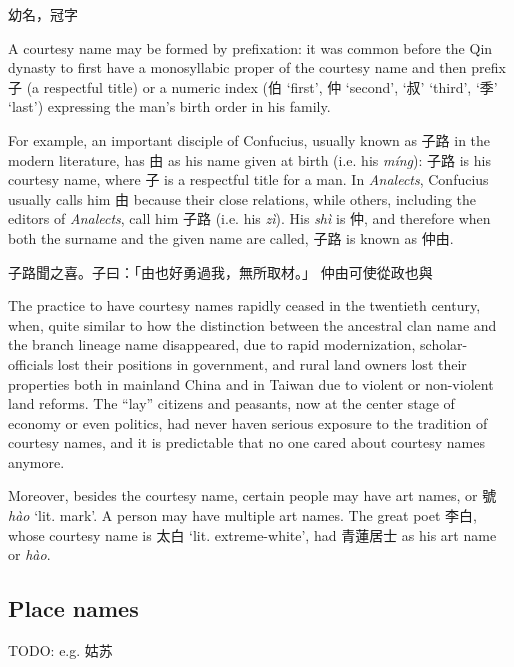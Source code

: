 \documentclass[UTF8, a4paper, oneside, scheme=plain, 12pt]{ctexrep}
\newcommand{\form}[1]{\emph{#1}}
\newcommand{\translate}[1]{`#1'}
\begin{document}
\begin{exe}
    \ex 幼名，冠字
\end{exe}

A courtesy name may be formed by prefixation:
it was common before the Qin dynasty to first have a monosyllabic proper of the courtesy name
and then prefix 子 (a respectful title) or a numeric index (伯 \translate{first}, 仲 \translate{second}, \translate{叔} \translate{third}, \translate{季} \translate{last}) expressing the man's birth order in his family.

For example, an important disciple of Confucius, usually known as 子路 in the modern literature,
has 由 as his name given at birth (i.e. his \form{míng}):
子路 is his courtesy name, where 子 is a respectful title for a man.
In \form{Analects}, Confucius usually calls him 由 because their close relations,
while others, including the editors of \form{Analects}, call him 子路 (i.e. his \form{zì}).
His \form{shì} is 仲, and therefore when both the surname and the given name are called,
子路 is known as 仲由.

\begin{exe}
    \ex 子路聞之喜。子曰：「由也好勇過我，無所取材。」
    \ex 仲由可使從政也與
\end{exe}

The practice to have courtesy names rapidly ceased in the twentieth century,
when, quite similar to how the distinction between the ancestral clan name and the branch lineage name disappeared,
due to rapid modernization, scholar-officials lost their positions in government,
and rural land owners lost their properties both in mainland China and in Taiwan
due to violent or non-violent land reforms.
The ``lay'' citizens and peasants, now at the center stage of economy or even politics,
had never haven serious exposure to the tradition of courtesy names,
and it is predictable that no one cared about courtesy names anymore.

Moreover, besides the courtesy name, certain people may have art names,
or 號 \form{hào} \translate{lit. mark}.
A person may have multiple art names.
The great poet 李白, whose courtesy name is 太白 \translate{lit. extreme-white},
had 青蓮居士 as his art name or \form{hào}.

\subsection{Place names}

TODO: e.g. 姑苏
\end{document}
